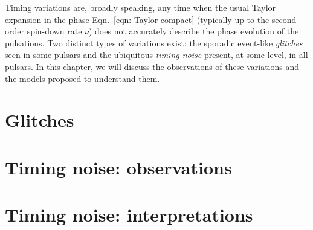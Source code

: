 \documentclass[../full_thesis/full_thesis.tex]{subfiles}
\newcommand{\thisdir}{../timing_variations}
\begin{document}
Timing variations are, broadly speaking, any time when the usual Taylor
expansion in the phase Eqn.~\eqref{eqn: Taylor compact} (typically up to the 
second-order spin-down rate $\ddot{\nu}$) does not accurately
describe the phase evolution of the pulsations. Two distinct types of variations
exist: the sporadic event-like \emph{glitches} seen in some pulsars
and the ubiquitous \emph{timing noise} present, at some level, in all pulsars.
In this chapter, we will discuss the observations of these variations and the
models proposed to understand them.

\section{Glitches}
\label{sec: glitches}


\section{Timing noise: observations}
\label{sec: timing noise observations}


\section{Timing noise: interpretations}
\label{sec: timing noise interpretations}


\biblio
\end{document}
